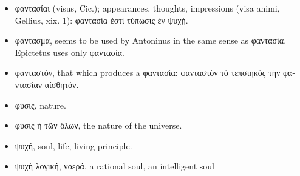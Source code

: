 \begin{itemize}[leftmargin=*]
\setlength\itemsep{0em}
\item
  \textgreek{φαντασίαι} (visus, Cic.); appearances, thoughts, impressions (visa
  animi, Gellius, xix. 1): \textgreek{φαντασία ἐστὶ τύπωσις ἐν ψυχῄ}.
\item
  \textgreek{φάντασμα}, seems to be used by Antoninus in the same sense as \textgreek{φαντασία}.
  Epictetus uses only \textgreek{φαντασία}.
\item
  \textgreek{φανταστόν}, that which produces a \textgreek{φαντασία: φανταστὸν τὸ τεπσιηκὸς τὴν
  φαντασίαν αίσθητόν}.
\item
  \textgreek{φύσις}, nature.
\item
  \textgreek{φύσις ἡ τῶν ὄλων}, the nature of the universe.
\end{itemize}

\begin{itemize}[leftmargin=*]
\setlength\itemsep{0em}
\item
  \textgreek{ψυχή}, soul, life, living principle.
\item
  \textgreek{ψυχὴ λογική, νοερά}, a rational soul, an intelligent soul
\end{itemize}

